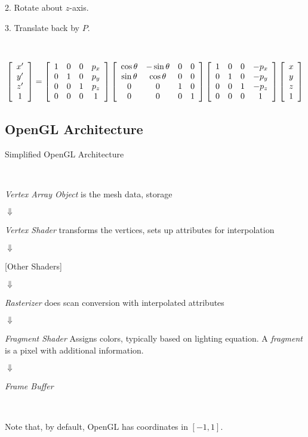 2.  Rotate about $z$-axis.

3.  Translate back by $P$.  

\

$$
	\left[
		\begin{array}{cccc}
			x' \cr y' \cr z' \cr 1 \cr
		\end{array}
	\right]
=
	\left[
		\begin{array}{cccc}
			1 & 0 & 0 & p_x \cr
			0 & 1 & 0 & p_y \cr
			0 & 0 & 1 & p_z \cr
			0 & 0 & 0 & 1 \cr
		\end{array}
	\right]
	\left[
		\begin{array}{cccc}
			\cos \theta & -\sin \theta & 0 & 0 \cr
			\sin \theta & \cos \theta & 0 & 0 \cr
			0 & 0 & 1 & 0 \cr
			0 & 0 & 0 & 1 \cr
		\end{array}
	\right]
	\left[
		\begin{array}{cccc}
			1 & 0 & 0 & -p_x \cr
			0 & 1 & 0 & -p_y \cr
			0 & 0 & 1 & -p_z \cr
			0 & 0 & 0 & 1 \cr
		\end{array}
	\right]
	\left[
		\begin{array}{cccc}
			x  \cr
			y \cr
			z \cr
			1
		\end{array}
	\right]
$$


\subsection{OpenGL Architecture}

Simplified OpenGL Architecture

\

{\it Vertex Array Object} is the mesh data, storage

\qquad $\Downarrow$

{\it Vertex Shader} transforms the vertices, sets up attributes for interpolation


\qquad $\Downarrow$

[Other Shaders]

\qquad $\Downarrow$


{\it Rasterizer} does scan conversion with interpolated attributes

\qquad $\Downarrow$


{\it Fragment Shader} Assigns colors, typically based on lighting equation.  
A {\it fragment} is a pixel with additional information.

\qquad $\Downarrow$


{\it Frame Buffer}

\

Note that, by default, OpenGL has coordinates in $[-1,1]$.

